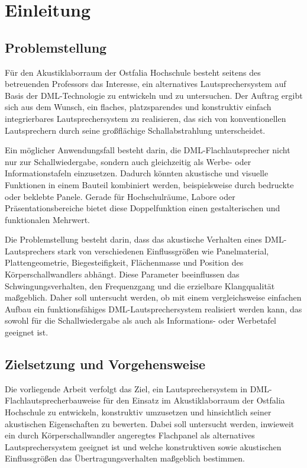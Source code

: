 \chapter{Einleitung}


\section{Problemstellung}


Für den Akustiklaborraum der Ostfalia Hochschule besteht seitens des betreuenden Professors das Interesse, ein alternatives Lautsprechersystem auf Basis der DML-Technologie zu entwickeln und zu untersuchen. Der Auftrag ergibt sich aus dem Wunsch, ein flaches, platzsparendes und konstruktiv einfach integrierbares Lautsprechersystem zu realisieren, das sich von konventionellen Lautsprechern durch seine großflächige Schallabstrahlung unterscheidet.

Ein möglicher Anwendungsfall besteht darin, die DML-Flachlautsprecher nicht nur zur Schallwiedergabe, sondern auch gleichzeitig als Werbe- oder Informationstafeln einzusetzen. Dadurch könnten akustische und visuelle Funktionen in einem Bauteil kombiniert werden, beispielsweise durch bedruckte oder beklebte Panele. Gerade für Hochschulräume, Labore oder Präsentationsbereiche bietet diese Doppelfunktion einen gestalterischen und funktionalen Mehrwert.

Die Problemstellung besteht darin, dass das akustische Verhalten eines DML-Lautsprechers stark von verschiedenen Einflussgrößen wie Panelmaterial, Plattengeometrie, Biegesteifigkeit, Flächenmasse und Position des Körperschallwandlers abhängt. Diese Parameter beeinflussen das Schwingungsverhalten, den Frequenzgang und die erzielbare Klangqualität maßgeblich. Daher soll untersucht werden, ob mit einem vergleichsweise einfachen Aufbau ein funktionsfähiges DML-Lautsprechersystem realisiert werden kann, das sowohl für die Schallwiedergabe als auch als Informations- oder Werbetafel geeignet ist.

\section{Zielsetzung und Vorgehensweise}

Die vorliegende Arbeit verfolgt das Ziel, ein Lautsprechersystem in DML-Flachlautsprecherbauweise für den Einsatz im Akustiklaborraum der Ostfalia Hochschule zu entwickeln, konstruktiv umzusetzen und hinsichtlich seiner akustischen Eigenschaften zu bewerten. Dabei soll untersucht werden, inwieweit ein durch Körperschallwandler angeregtes Flachpanel als alternatives Lautsprechersystem geeignet ist und welche konstruktiven sowie akustischen Einflussgrößen das Übertragungsverhalten maßgeblich bestimmen.

